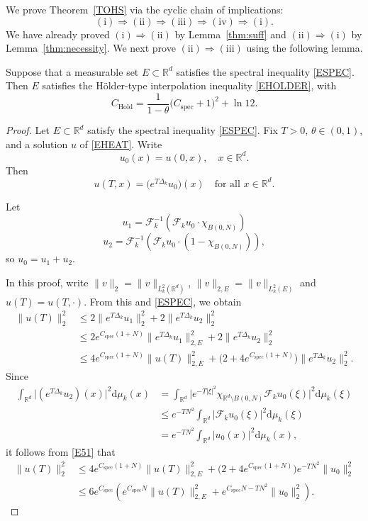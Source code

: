 \documentclass[12pt]{article}
\begin{document}
We prove Theorem~\ref{TOHS} via the cyclic chain of implications:
\[
(\mathrm{i}) \Rightarrow (\mathrm{ii}) \Rightarrow (\mathrm{iii}) \Rightarrow (\mathrm{iv}) \Rightarrow (\mathrm{i}).
\]
We have already proved $(\mathrm{i}) \Rightarrow (\mathrm{ii})$ by Lemma~\ref{thm:suff} and $(\mathrm{ii}) \Rightarrow (\mathrm{i})$ by Lemma~\ref{thm:necessity}. We next prove $(\mathrm{ii}) \Rightarrow (\mathrm{iii})$ using the following lemma.
\begin{lemma}\label{L61}
Suppose that a measurable set $E \subset \mathbb{R}^d$ satisfies the spectral inequality \eqref{ESPEC}. Then $E$ satisfies the H\"older-type interpolation inequality \eqref{EHOLDER}, with
\[
C_{\mathrm{Hold}} = \frac{1}{1-\theta}\big(C_{\mathrm{spec}}+1\big)^2 + \ln 12.
\]
\end{lemma}
\begin{proof}
Let $E \subset \mathbb{R}^d$ satisfy the spectral inequality \eqref{ESPEC}. Fix $T > 0$, $\theta \in (0,1)$, and a solution $u$ of \eqref{EHEAT}. Write
\[
u_0(x) = u(0,x),\quad x \in \mathbb{R}^d.
\]
Then
\[
u(T,x) = \big(e^{T\Delta_k} u_0\big)(x) \quad \text{for all } x \in \mathbb{R}^d.
\]

Let
\[
u_1=\mathcal{F}_k^{-1} (\mathcal{F}_k u_0 \cdot \chi_{B(0,N)})
\]
\[
u_2=\mathcal{F}_k^{-1} (\mathcal{F}_k u_0 \cdot (1-\chi_{B(0,N)})),
\]
so $u_0=u_1+u_2$.

In this proof, write $\|v\|_2=\|v\|_{L_k^2(\mathbb{R}^d)}$,
$\|v\|_{2,E}=\|v\|_{L_k^2(E)}$ and $u(T)=u(T,\cdot)$. From this and \eqref{ESPEC}, we obtain
\begin{equation}\label{E51}
\begin{aligned}
\|u(T)\|_2^2
&\le 2\|e^{T\Delta_k}u_1\|_2^2+2\|e^{T\Delta_k}u_2\|_2^2\\
&\le 2e^{C_{\mathrm{spec}}(1+N)}\|e^{T\Delta_k}u_1\|_{2,E}^2
      +2\|e^{T\Delta_k}u_2\|_2^2\\
&\le 4e^{C_{\mathrm{spec}}(1+N)}\|u(T)\|_{2,E}^2
      +\bigl(2+4e^{C_{\mathrm{spec}}(1+N)}\bigr)\|e^{T\Delta_k}u_2\|_2^2.
\end{aligned}
\end{equation}
Since
\begin{align*}
\int_{\mathbb{R}^d} \big|(e^{T\Delta_k}u_2)(x)\big|^2 \mathrm{d}\mu_k(x)
&= \int_{\mathbb{R}^d} \big|e^{-T|\xi|^2} \chi_{\mathbb{R}^d\setminus B(0,N)}\mathcal{F}_k u_0(\xi)\big|^2 \mathrm{d}\mu_k(\xi) \\
&\le e^{-TN^2} \int_{\mathbb{R}^d} \big|\mathcal{F}_k u_0(\xi)\big|^2 \mathrm{d}\mu_k(\xi) \\
&= e^{-TN^2} \int_{\mathbb{R}^d} |u_0(x)|^2 \mathrm{d}\mu_k(x),
\end{align*}
it follows from \eqref{E51} that
\begin{equation}\label{E52}
\begin{aligned}
\|u(T)\|_2^2
&\le 4e^{C_{\mathrm{spec}}(1+N)}\|u(T)\|_{2,E}^2
  +\bigl(2+4e^{C_{\mathrm{spec}}(1+N)}\bigr)e^{-TN^2}\|u_0\|_2^2\\
&\le 6e^{C_{\mathrm{spec}}}\left(
 e^{C_{\mathrm{spec}}N}\|u(T)\|_{2,E}^2
 +e^{C_{\mathrm{spec}}N-TN^2}\|u_0\|_2^2\right).
\end{aligned}
\end{equation}


\end{proof}
\end{document}

